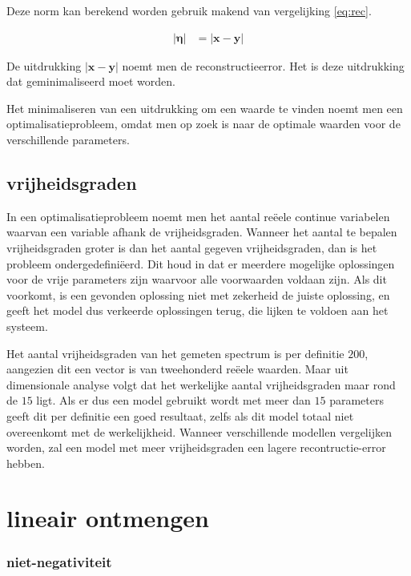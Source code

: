 \documentclass[12pt]{report}
\begin{document}
Deze norm kan berekend worden gebruik makend van vergelijking \ref{eq:rec}.

\begin{eqnarray}
\left|\bm{\eta}\right| &= \left|\bm{x} - \bm{y}\right|
\end{eqnarray}

De uitdrukking $\left|\bm{x} - \bm{y}\right|$ noemt men de reconstructieerror. Het is deze uitdrukking dat geminimaliseerd moet worden.

Het minimaliseren van een uitdrukking om een waarde te vinden noemt men een optimalisatieprobleem, omdat men op zoek is naar de optimale waarden voor de verschillende parameters.

\subsection{vrijheidsgraden}

In een optimalisatieprobleem noemt men het aantal re\"eele continue variabelen waarvan een variable afhank de vrijheidsgraden. Wanneer het aantal te bepalen vrijheidsgraden groter is dan het aantal gegeven vrijheidsgraden, dan is het probleem ondergedefini\"eerd. Dit houd in dat er meerdere mogelijke oplossingen voor de vrije parameters zijn waarvoor alle voorwaarden voldaan zijn. Als dit voorkomt, is een gevonden oplossing niet met zekerheid de juiste oplossing, en geeft het model dus verkeerde oplossingen terug, die lijken te voldoen aan het systeem.

Het aantal vrijheidsgraden van het gemeten spectrum is per definitie $200$, aangezien dit een vector is van tweehonderd re\"eele waarden. Maar uit dimensionale analyse volgt dat het werkelijke aantal vrijheidsgraden maar rond de $15$ ligt. Als er dus een model gebruikt wordt met meer dan $15$ parameters geeft dit per definitie een goed resultaat, zelfs als dit model totaal niet overeenkomt met de werkelijkheid. Wanneer verschillende modellen vergelijken worden, zal een model met meer vrijheidsgraden een lagere recontructie-error hebben.  

\section{lineair ontmengen}




\subsubsection{niet-negativiteit}
\end{document}
